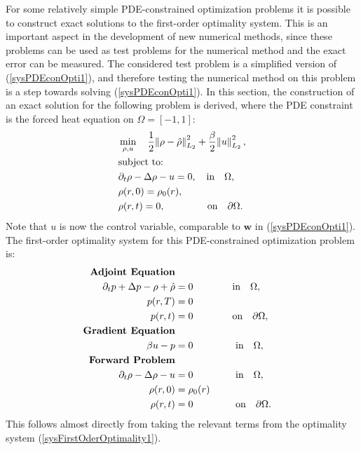 For some relatively simple PDE-constrained optimization problems it is possible to construct exact solutions to the first-order optimality system. This is an important aspect in the development of new numerical methods, since these problems can be used as test problems for the numerical method and the exact error can be measured. The considered test problem is a simplified version of (\ref{sysPDEconOpti1}), and therefore testing the numerical method on this problem is a step towards solving (\ref{sysPDEconOpti1}). In this section, the construction of an exact solution for the following problem is derived, where the PDE constraint is the forced heat equation on $\Omega =[-1,1]$:
\begin{align}\label{sysOptimalHeating1}
&\min_{\rho,u} \quad \frac{1}{2}\norm{\rho- \hat{\rho}}_{L_2}^2 + \frac{\beta}{2} \norm{u}_{L_2}^2,\\
&\text{subject to:}\notag 
\notag \\
&\partial_t \rho - \Delta \rho - u=0,  \quad \text{in} \quad \Omega,\notag 
\notag \\
&\rho(r,0)=\rho_0(r),\notag 
\notag \\
& \rho(r,t)=0, \quad  \quad \quad \quad \ \text{on} \quad \partial \Omega. \notag 
\end{align}
Note that $u$ is now the control variable, comparable to $\mathbf{w}$ in (\ref{sysPDEconOpti1}).
The first-order optimality system for this PDE-constrained optimization problem is:
\begin{align} \label{sysPotimaltiyheatequn1}
\textbf{Adjoint Equation} \notag \\
\partial_t p + \Delta p -\rho +\hat{\rho} &=0 \ \ \ \quad \quad \quad \text{in} \quad \Omega,  \\
p(r,T) &= 0 \notag\\
p(r,t) &=0 \quad \quad\quad\quad \text{on} \quad \partial\Omega, \notag\\
\textbf{Gradient Equation} \notag \\
\beta u  - p  &=0 \quad \quad\quad\quad \ \text{in} \quad \Omega, \notag \\
\textbf{Forward Problem} \notag \\
\partial_t \rho - \Delta \rho - u &=0 \ \quad \quad\quad\quad \text{in} \quad \Omega, \notag \\ 
\rho(r,0)&=\rho_0(r) \notag \\
\rho(r,t) &=0 \quad \quad\quad\quad \ \text{on} \quad \partial \Omega \notag. 
\end{align}
This follows almost directly from taking the relevant terms from the optimality system (\ref{sysFirstOderOptimality1}).
